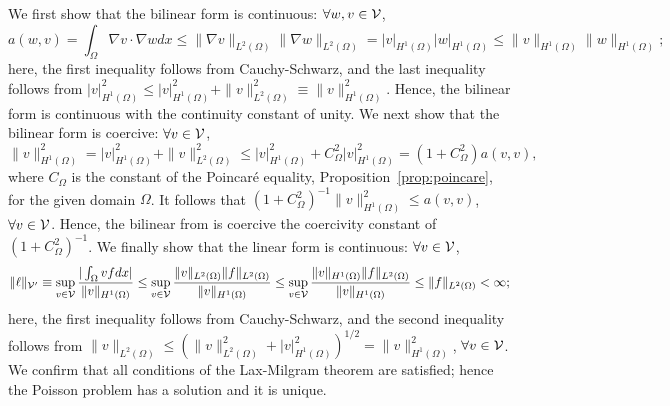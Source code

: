 We first show that the bilinear form is continuous: $\forall w,v \in \mathcal{V}$, 
\begin{equation*}
  a(w,v)
  =
  \int_\Omega \nabla v \cdot \nabla w dx
  \leq
  \| \nabla v \|_{L^2(\Omega)} \| \nabla w \|_{L^2(\Omega)}
  =
  | v |_{H^1(\Omega)} | w |_{H^1(\Omega)}
  \leq
  \| v \|_{H^1(\Omega)} \| w \|_{H^1(\Omega)};
\end{equation*}
here, the first inequality follows from Cauchy-Schwarz, and the last inequality follows from $| v |_{H^1(\Omega)}^2 \leq | v |_{H^1(\Omega)}^2 + \| v \|_{L^2(\Omega)}^2 \equiv \| v \|_{H^1(\Omega)}^2$.  Hence, the bilinear form is continuous with the continuity constant of unity.
We next show that the bilinear form is coercive: $\forall v \in \mathcal{V}$,
\begin{equation*}
  \| v \|^2_{H^1(\Omega)} = | v |^2_{H^1(\Omega)} + \| v \|^2_{L^2(\Omega)}
  \leq | v |^2_{H^1(\Omega)} + C_{\Omega}^2 | v |^2_{H^1(\Omega)}
  = (1 + C_{\Omega}^2) a(v,v),
\end{equation*}
where $C_{\Omega}$ is the constant of the Poincar\'e equality, Proposition~\ref{prop:poincare}, for the given domain $\Omega$.  It follows that $(1+C_\Omega^2)^{-1}\| v \|^2_{H^1(\Omega)} \leq a(v,v)$, $\forall v \in \mathcal{V}$. Hence, the bilinear from is coercive the coercivity constant of $(1 + C_\Omega^2)^{-1}$.  We finally show that the linear form is continuous: $\forall v \in \mathcal{V}$, 
\begin{equation*}
  \| \ell \|_{\mathcal{V}'} \equiv \sup_{v \in \mathcal{V}}
  \frac{|\int_\Omega v f dx|}{\| v \|_{H^1(\Omega)}}
  \leq \sup_{v \in \mathcal{V}} \frac{\| v \|_{L^2(\Omega)} \| f \|_{L^2(\Omega)}}{\| v \|_{H^1(\Omega)}}
  \leq \sup_{v \in \mathcal{V}} \frac{\| v \|_{H^1(\Omega)} \| f \|_{L^2(\Omega)}}{\| v \|_{H^1(\Omega)}}
  \leq\| f \|_{L^2(\Omega)} < \infty;
\end{equation*}
here, the first inequality follows from Cauchy-Schwarz, and the second inequality follows from $\| v\|_{L^2(\Omega)} \leq (\| v \|^2_{L^2(\Omega)} + | v |_{H^1(\Omega)}^2)^{1/2} = \| v \|_{H^1(\Omega)}^2$, $\forall v \in \mathcal{V}$.  We confirm that all conditions of the Lax-Milgram theorem are satisfied; hence the Poisson problem has a solution and it is unique.

